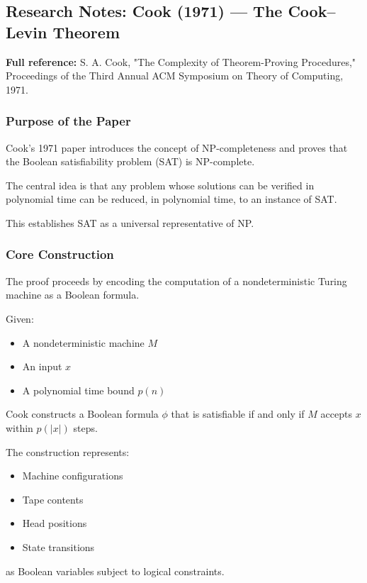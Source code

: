 \documentclass[12pt]{article}
\begin{document}
\subsection{Research Notes: Cook (1971) --- The Cook--Levin Theorem}

\textbf{Full reference:} S. A. Cook, "The Complexity of Theorem-Proving Procedures," Proceedings of the Third Annual ACM Symposium on Theory of Computing, 1971.

\subsubsection*{Purpose of the Paper}

Cook's 1971 paper introduces the concept of NP-completeness and proves that the Boolean satisfiability problem (SAT) is NP-complete.

The central idea is that any problem whose solutions can be verified in polynomial time can be reduced, in polynomial time, to an instance of SAT.

This establishes SAT as a universal representative of NP.

\subsubsection*{Core Construction}

The proof proceeds by encoding the computation of a nondeterministic Turing machine as a Boolean formula.

Given:
\begin{itemize}
\item A nondeterministic machine $M$
\item An input $x$
\item A polynomial time bound $p(n)$
\end{itemize}

Cook constructs a Boolean formula $\phi$ that is satisfiable if and only if $M$ accepts $x$ within $p(|x|)$ steps.

The construction represents:

\begin{itemize}
\item Machine configurations
\item Tape contents
\item Head positions
\item State transitions
\end{itemize}

as Boolean variables subject to logical constraints.
\end{document}
